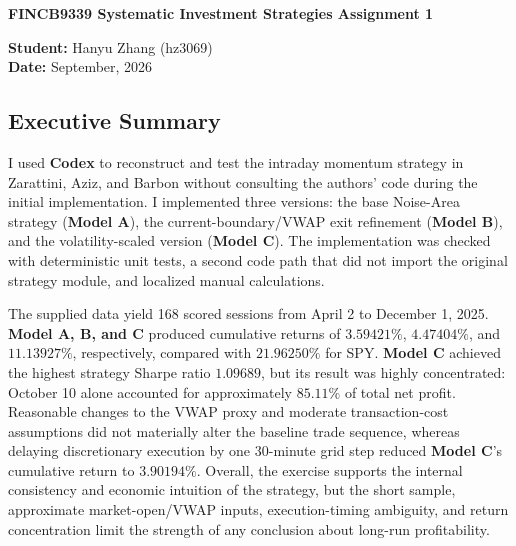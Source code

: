 \documentclass{article}
\begin{document}
\begin{center}
    {\Large\bfseries FINCB9339 Systematic Investment Strategies Assignment 1}\\[0.25em]
    {\large }
\end{center}


\begin{center}
    \textbf{Student:} Hanyu Zhang (hz3069) \\
    \textbf{Date:} September, 2026
\end{center}


\subsection*{Executive Summary}
I used \textbf{Codex} to reconstruct and test the intraday momentum strategy in Zarattini, Aziz, and Barbon without consulting the authors' code during the initial implementation. I implemented three versions: the base Noise-Area strategy (\textbf{Model A}), the current-boundary/VWAP exit refinement (\textbf{Model B}), and the volatility-scaled version (\textbf{Model C}). The implementation was checked with deterministic unit tests, a second code path that did not import the original strategy module, and localized manual calculations.

The supplied data yield 168 scored sessions from April 2 to December 1, 2025. \textbf{Model A, B, and C} produced cumulative returns of \(3.59421\%\), \(4.47404\%\), and \(11.13927\%\), respectively, compared with \(21.96250\%\) for SPY.\textbf{ Model C} achieved the highest strategy Sharpe ratio \(1.09689\), but its result was highly concentrated: October 10 alone accounted for approximately \(85.11\%\) of total net profit. Reasonable changes to the VWAP proxy and moderate transaction-cost assumptions did not materially alter the baseline trade sequence, whereas delaying discretionary execution by one 30-minute grid step reduced\textbf{ Model C}'s cumulative return to \(3.90194\%\). Overall, the exercise supports the internal consistency and economic intuition of the strategy, but the short sample, approximate market-open/VWAP inputs, execution-timing ambiguity, and return concentration limit the strength of any conclusion about long-run profitability.

\end{document}
